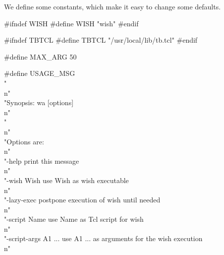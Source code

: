 
We define some constants, which make it easy to change some defaults.

\nwenddocs{}\endmoddef\let\nwnotused=\nwoutput{}\nwstartdeflinemarkup{}\nwenddeflinemarkup
#ifndef WISH
#define WISH    "wish"
#endif

#ifndef TBTCL
#define TBTCL   "/usr/local/lib/tb.tcl"
#endif

#define MAX_ARG 50


#define USAGE_MSG \\
   "\\n" \\
   "Synopsis: wa [options]\\n" \\
   "\\n" \\
   "Options are:\\n" \\
   "-help                 print this message\\n" \\
   "-wish Wish            use Wish as wish executable\\n" \\
   "-lazy-exec            postpone execution of wish until needed\\n" \\
   "-script Name          use Name as Tcl script for wish\\n" \\
   "-script-args A1 ...   use A1 ... as arguments for the wish execution\\n"

